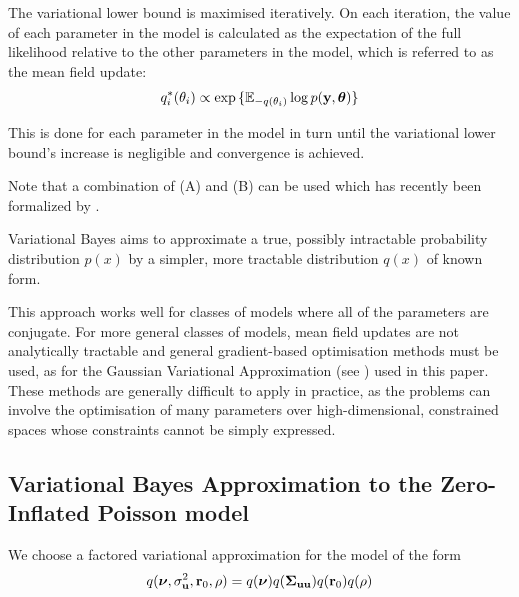 \documentclass{amsart}[12pt]
\begin{document}
\noindent The variational lower bound is maximised iteratively. On each iteration, the value of each parameter
in the model is calculated as the expectation of the full likelihood relative to the other parameters in the
model, which is referred to as the mean field update:
$$q_i^*(\theta_i) \propto \exp{\{ {\mathbb E}_{-q(\theta_i)} \log p({\bf y}, {\boldsymbol\theta}) \}}$$

\noindent This is done for each parameter in the model in turn until the variational lower bound's increase is
negligible and convergence is achieved.

Note that a combination of (A) and (B) can be used which has recently been formalized by \cite{Rohde2015}.

\noindent Variational Bayes aims to approximate a true, possibly intractable probability distribution $p(x)$
by a simpler, more tractable distribution $q(x)$ of known form.

This approach works well for classes of models where all of the parameters are conjugate. For more
general classes of models, mean field updates are not analytically tractable and general gradient-based
optimisation methods must be used, as for the Gaussian Variational Approximation (see \citep{Ormerod2012}) used
in this paper. These methods are generally difficult to apply in practice, as the problems can involve the
optimisation of many parameters over high-dimensional, constrained spaces whose constraints cannot be simply
expressed.


\subsection{Variational Bayes Approximation to the Zero-Inflated Poisson model}

We choose a factored variational approximation for the model of the form 
\[
	q({\boldsymbol \nu}, \sigma_{{\bf u}}^2,{\bf r}_0, \rho) = q({\boldsymbol \nu}) q({\boldsymbol \Sigma}_{{\bf u} {\bf u}}) q({\bf r}_0) q(\rho)
\]
\end{document}
